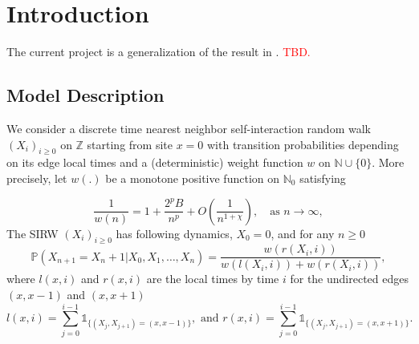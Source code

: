 \documentclass[twoside,12pt,a4paper]{article}
\numberwithin{equation}{section}
\newcommand\TBD{\textcolor{red}{TBD.}}
\begin{document}
		\maketitle

\begin{abstract}
	This document is an outline of the article for the Scaling limit of SIRW. We generalize the functional CLT in \cite{KMP22} for the asymptotically free self-interacting random walk (AF-SIRW) in the case $0<p \leq \frac{1}{2}$. The approach is to carefully approximate the local drifts of the random walk via the study of the directed edge local times, which are described by branching-like processes and generalized Ray-knight Theorems. Xiaoyu Liu and Zhe Wang are working on this project. 
	\TBD
\end{abstract}

\section{Introduction}
The current project is a generalization of the result in \cite{KMP22}. 
\TBD 


\subsection{Model Description} 
We consider a discrete time nearest neighbor self-interaction random walk $(X_i)_{i\geq 0}$ on $\mathbb{Z}$ starting from site $x=0$ with transition probabilities depending on its edge local times and a (deterministic) weight function $w$ on $\mathbb{N}\cup \{0\}$. More precisely, let $w(.)$ be a monotone positive function on $\mathbb{N}_0$ satisfying

\begin{equation}\label{eq: asymptotics of w}
	\frac{1}{w(n)} = 1+\frac{2^p B}{n^p} + O\left(\frac{1}{n^{1+\mathcal{\chi}}}\right), \quad \mbox{as $n\to \infty$}, 	
\end{equation} 
The SIRW $(X_i)_{i\geq 0}$ has following dynamics, 
$X_0 = 0$, and for any $n\geq 0$
\begin{equation}\label{dynamic}
	\mathbb{P}\left( X_{n+1} =  X_n +1 | X_0,X_1,\dots,X_n   \right) =  \frac{  w(r(X_i,i) )}{ w(l(X_i,i))  + w(r(X_i,i))   },
\end{equation}
where $l(x,i)$ and $r(x,i)$ are the local times by time $i$ for the undirected edges $(x,x-1)$ and $(x,x+1)$
$$ l(x,i) = \sum_{j=0}^{i-1} \mathbb{1}_{ \{  (X_j, X_{j+1}) =  (x,x-1) \} }, \mbox{ and }  r(x,i) = \sum_{j=0}^{i-1} \mathbb{1}_{ \{  (X_j, X_{j+1}) =  (x,x+1) \} }.        $$
\end{document}
